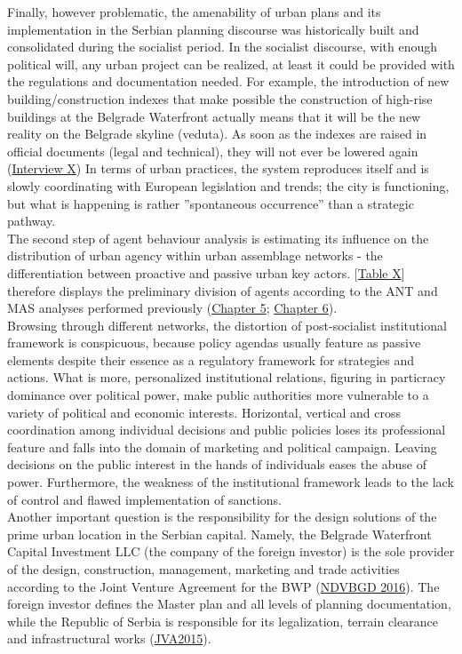 \documentclass[11pt]{report}
\begin{document}
{{{Finally, however problematic, the amenability of urban plans and its implementation in the Serbian planning discourse was historically built and consolidated during the socialist period. In the socialist discourse, with enough political will, any urban project can be realized, at least it could be provided with the regulations and documentation needed. For example, the introduction of new building/construction indexes that make possible the construction of high-rise buildings at the Belgrade Waterfront actually means that it will be the new reality on the Belgrade skyline (veduta). As soon as the indexes are raised in official documents (legal and technical), they will not ever be lowered again 
(\href{InterviewX}{Interview X})
In terms of urban practices, the system reproduces itself and is slowly coordinating with European legislation and trends; the city is functioning, but what is happening is rather ”spontaneous occurrence” than a strategic pathway.
\\

The second step of agent behaviour analysis is estimating its influence on the distribution of urban agency within urban assemblage networks - the differentiation between proactive and passive urban key actors.
[\href{TableX}{Table X}] therefore displays the preliminary division of agents according to the ANT and MAS analyses performed previously (\href{Chapter 5}{Chapter 5}; \href{Chapter 6}{Chapter 6}).
\\

Browsing through different networks, the distortion of post-socialist institutional framework is conspicuous, because policy agendas usually feature as passive elements despite their essence as a regulatory framework for strategies and actions. What is more, personalized institutional relations, figuring in particracy dominance over political power, make public authorities more vulnerable to a variety of political and economic interests. Horizontal, vertical and cross coordination among individual decisions and public policies loses its professional feature and falls into the domain of marketing and political campaign. Leaving decisions on the public interest in the hands of individuals eases the abuse of power. Furthermore, the weakness of the institutional framework leads to the lack of control and flawed implementation of sanctions.
\\

Another important question is the responsibility for the design solutions of the prime urban location in the Serbian capital. Namely, the Belgrade Waterfront Capital Investment LLC (the company of the foreign investor) is the sole provider of the design, construction, management, marketing and trade activities according to the Joint Venture Agreement for the BWP  (\href{NDVBGD}{NDVBGD 2016}).
The foreign investor defines the Master plan and all levels of planning documentation, while the Republic of Serbia is responsible for its legalization, terrain clearance and infrastructural works (\href{JVA}{JVA2015}).
\\

}}}
\end{document}
